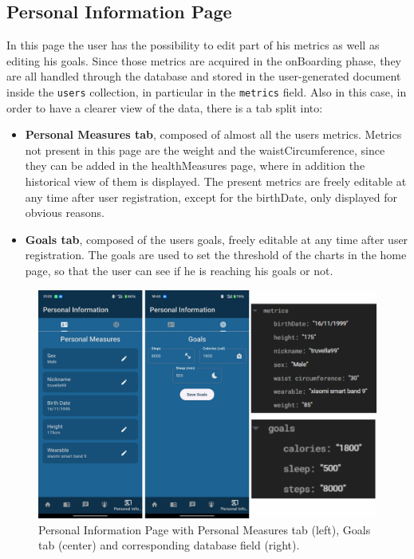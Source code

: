\subsection{Personal Information Page}
In this page the user has the possibility to edit part of his metrics as well as editing his goals. Since those metrics are acquired in the onBoarding phase, they are all handled through the database and stored in the user-generated document inside the \texttt{users} collection, in particular in the \texttt{metrics} field.
\newline Also in this case, in order to have a clearer view of the data, there is a tab split into:
\begin{itemize}[nosep] %
    \item \textbf{Personal Measures tab}, composed of almost all the users metrics. Metrics not present in this page are the weight and the waistCircumference, since they can be added in the healthMeasures page, where in addition the historical view of them is displayed. The present metrics are freely editable at any time after user registration, except for the birthDate, only displayed for obvious reasons.  
    \item \textbf{Goals tab}, composed of the users goals, freely editable at any time after user registration. The goals are used to set the threshold of the charts in the home page, so that the user can see if he is reaching his goals or not.
\end{itemize}

\begin{figure}
    \centering
    \includegraphics[width=0.7\linewidth]{./images/personalInformation.jpg}
    \caption{Personal Information Page with Personal Measures tab (left), Goals tab (center) and corresponding database field (right).}
\end{figure}

